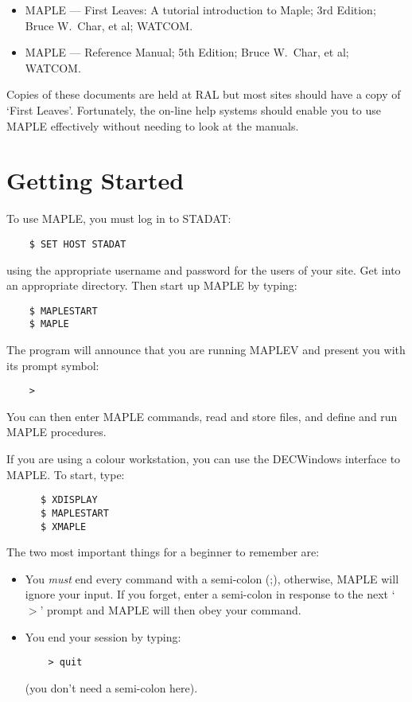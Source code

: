 \begin{itemize}
\item MAPLE --- First Leaves: A tutorial introduction to Maple; 3rd Edition;
Bruce W.\ Char, et al; WATCOM.
\item MAPLE --- Reference Manual; 5th Edition; Bruce W.\ Char, et al; WATCOM.
\end{itemize}

Copies of these documents are held at RAL but most sites should have a
copy of `First Leaves'.  Fortunately, the on-line help systems should
enable you to use MAPLE effectively without needing to look at the
manuals.

\section{Getting Started}

To use MAPLE, you must log in to STADAT:

\begin{verbatim}
    $ SET HOST STADAT
\end{verbatim}

using the appropriate username and password for the users of your site.
Get into an appropriate directory. Then start up MAPLE by typing:

\begin{verbatim}
    $ MAPLESTART
    $ MAPLE
\end{verbatim}

The program will announce that you are running MAPLEV and present you with
its prompt symbol:

\begin{verbatim}
    >
\end{verbatim}

You can then enter MAPLE commands, read and store files, and define and run
MAPLE procedures.

If you are using a colour workstation, you can use the DECWindows
interface to MAPLE.  To start, type: 

\begin{verbatim} 
      $ XDISPLAY 
      $ MAPLESTART 
      $ XMAPLE 
\end{verbatim}

The two most important things for a beginner to remember are:

\begin{itemize}

\item You {\em must} end every command with a semi-colon (;), otherwise,
MAPLE will ignore your input. If you forget, enter a semi-colon in
response to the next `$>$' prompt and MAPLE will then obey your command.

\item You end your session by typing:

\begin{verbatim}
    > quit
\end{verbatim}

(you don't need a semi-colon here).

\end{itemize}

